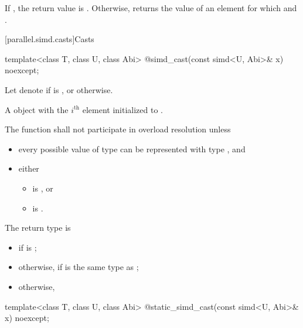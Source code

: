 \begin{itemdescr}
  \pnum\returns
  If , the return value is . Otherwise, returns the value of an element  for which  and  \forallmaskedi.
\end{itemdescr}

[parallel.simd.casts]{Casts}

\begin{itemdecl}
template<class T, class U, class Abi> @\seebelow@ simd_cast(const simd<U, Abi>& x) noexcept;
\end{itemdecl}

\begin{itemdescr}
  \pnum
  Let  denote  if  is , or  otherwise.

  \pnum\returns
  A  object with the $i^\text{th}$ element initialized to  \foralli.

  \pnum\remarks
  The function shall not participate in overload resolution unless
  \begin{itemize}
    \item every possible value of type  can be represented with type , and
    \item either
      \begin{itemize}
        \item {} is , or
        \item {} is .
      \end{itemize}
  \end{itemize}

  \pnum
  The return type is
  \begin{itemize}
    \item {} if  is ;
    \item otherwise,  if  is the same type as ;
    \item otherwise, 
  \end{itemize}
\end{itemdescr}

\begin{itemdecl}
template<class T, class U, class Abi> @\seebelow@ static_simd_cast(const simd<U, Abi>& x) noexcept;
\end{itemdecl}

